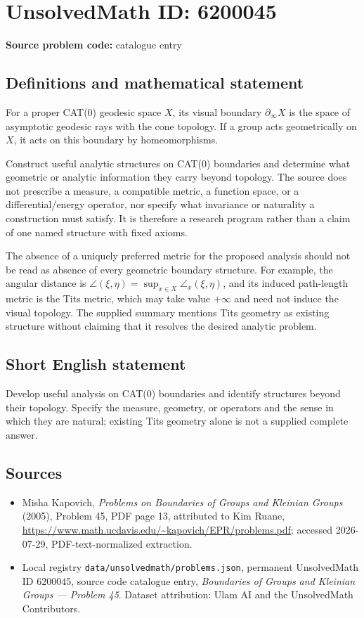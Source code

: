 \documentclass[11pt]{article}
\begin{document}
\section*{UnsolvedMath ID: 6200045}
\textbf{Source problem code:} catalogue entry
\subsection{Definitions and mathematical statement}
For a proper CAT(0) geodesic space $X$, its visual boundary $\partial_\infty X$ is the space of asymptotic geodesic rays with the cone topology. If a group acts geometrically on $X$, it acts on this boundary by homeomorphisms.

Construct useful analytic structures on CAT(0) boundaries and determine what geometric or analytic information they carry beyond topology. The source does not prescribe a measure, a compatible metric, a function space, or a differential/energy operator, nor specify what invariance or naturality a construction must satisfy. It is therefore a research program rather than a claim of one named structure with fixed axioms.

The absence of a uniquely preferred metric for the proposed analysis should not be read as absence of every geometric boundary structure. For example, the angular distance is $\angle(\xi,\eta)=\sup_{x\in X}\angle_x(\xi,\eta)$, and its induced path-length metric is the Tits metric, which may take value $+\infty$ and need not induce the visual topology. The supplied summary mentions Tits geometry as existing structure without claiming that it resolves the desired analytic problem.
\subsection{Short English statement}
Develop useful analysis on CAT(0) boundaries and identify structures beyond their topology. Specify the measure, geometry, or operators and the sense in which they are natural; existing Tits geometry alone is not a supplied complete answer.
\subsection{Sources}
\begin{itemize}
\item Misha Kapovich, \emph{Problems on Boundaries of Groups and Kleinian Groups} (2005), Problem 45, PDF page 13, attributed to Kim Ruane, \url{https://www.math.ucdavis.edu/~kapovich/EPR/problems.pdf}; accessed 2026-07-29, PDF-text-normalized extraction.
\item Local registry \texttt{data/unsolvedmath/problems.json}, permanent UnsolvedMath ID $6200045$, source code catalogue entry, \emph{Boundaries of Groups and Kleinian Groups --- Problem 45}. Dataset attribution: Ulam AI and the UnsolvedMath Contributors.
\end{itemize}
\end{document}
